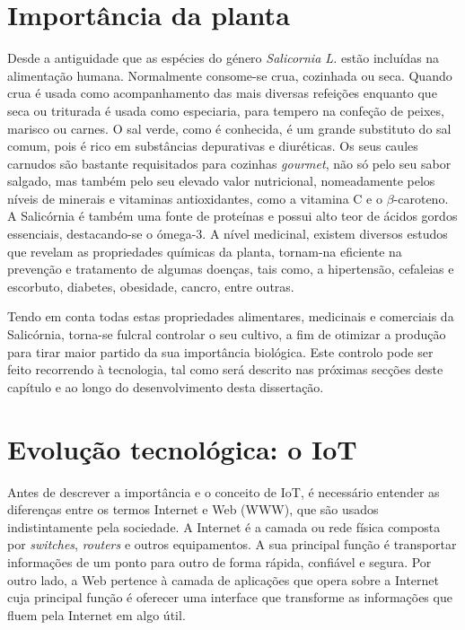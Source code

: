 \section{Importância da planta}

Desde a antiguidade que as espécies do género \textit{Salicornia L.} estão incluídas na alimentação humana. Normalmente consome-se crua, cozinhada ou seca. Quando crua é usada como acompanhamento das mais diversas refeições enquanto que seca ou triturada é usada como especiaria, para tempero na confeção de peixes, marisco ou carnes. O sal verde, como é conhecida, é um grande substituto do sal comum, pois é rico em substâncias depurativas e diuréticas. Os seus caules carnudos são bastante requisitados para cozinhas \textit{gourmet}, não só pelo seu sabor salgado, mas também pelo seu elevado valor nutricional\cite{Filomena2009}, nomeadamente pelos níveis de minerais e vitaminas antioxidantes, como a  vitamina C e o $\beta$-caroteno. A Salicórnia é também uma fonte de proteínas e possui alto teor de ácidos gordos essenciais, destacando-se o  ómega-3\cite{Ventura2011}. A nível medicinal, existem diversos estudos que revelam as propriedades químicas da planta, tornam-na eficiente na prevenção e tratamento de algumas doenças, tais como, a hipertensão, cefaleias e escorbuto, diabetes, obesidade, cancro, entre outras\cite{Wang2012}.

Tendo em conta todas estas propriedades alimentares, medicinais e comerciais da Salicórnia, torna-se fulcral controlar o seu cultivo, a fim de otimizar a produção para tirar maior partido da sua importância biológica. Este controlo pode ser feito recorrendo à tecnologia, tal como será descrito nas próximas secções deste capítulo e ao longo do desenvolvimento desta dissertação.  






\section{Evolução tecnológica: o \acl{IoT}}


Antes de descrever a importância e o conceito de \ac{IoT}, é necessário entender as diferenças entre os termos Internet e Web (\ac{WWW}), que são usados indistintamente pela sociedade. A Internet é a camada ou rede física composta por \textit{switches}, \textit{routers} e outros equipamentos. A sua principal função é transportar informações de um ponto para outro de forma rápida, confiável e segura. Por outro lado, a Web pertence à camada de aplicações que opera sobre a Internet cuja principal função é oferecer uma interface que transforme as informações que fluem pela Internet em algo útil\cite{Evans2011a}.


